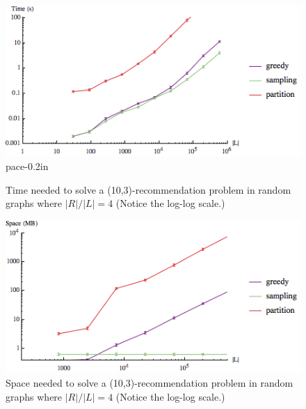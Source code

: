 \begin{figure}
\centering
\begin{minipage}[h]{.48\textwidth}
\centering
\includegraphics[width=.99\textwidth]{images/time1_error.png}
 pace{-0.2in}
\caption{Time needed to solve a (10,3)-recommendation problem in random graphs where $|R|/|L|=4$ (Notice the log-log scale.)}\label{fig:time_graph}
\end{minipage}
\vspace{.2cm}
\hspace{0cm}
\begin{minipage}[h]{.48\textwidth}
\centering
\includegraphics[width=.99\textwidth]{images/space_error.png}
\vspace{-0.2in}
\caption{Space needed to solve a (10,3)-recommendation problem in random graphs where $|R|/|L|=4$ (Notice the log-log scale.)}\label{fig:space_graph}
\end{minipage}
\vspace{-0.2in}
\end{figure}

